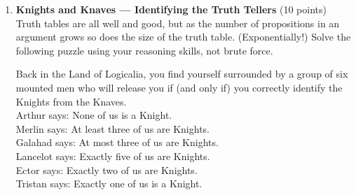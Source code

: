 \begin{enumerate}
\begin{subprove}
    We continue the chain of equivalence as $((\bar{q} \wedge \bar{p}) \vee \boldsymbol{F}) \vee (\boldsymbol{F} \vee (p \wedge q)) \equiv (p \wedge q) \vee (\bar{p} \wedge \bar{q})$ by simplifying terms on both sides of the main disjunction using first $\square$ and then $\square$ (and using $\square$ as needed to reorder within parentheses). \\
    Hence, we have shown that $p \leftrightarrow q \equiv (p \wedge q) \vee (\bar{p} \wedge \bar{q})$, and the claim holds. 
  \end{subprove}

  




  \newpage


  \item \textbf{Knights and Knaves --- Identifying the Truth Tellers} (10 points)\\
  Truth tables are all well and good, but as the number of propositions in an argument grows so 
  does the size of the truth table. (Exponentially!) Solve the following puzzle using your reasoning skills, not brute force.

  Back in the Land of Logicalia, you find yourself surrounded by a group of six mounted men who will release you if (and only if) you correctly identify the Knights from the Knaves.\\

  Arthur says: None of us is a Knight.\\
  Merlin says: At least three of us are Knights.\\
  Galahad says: At most three of us are Knights.\\
  Lancelot says: Exactly five of us are Knights.\\
  Ector says: Exactly two of us are Knights.\\
  Tristan says: Exactly one of us is a Knight.\\
  

\end{enumerate}

